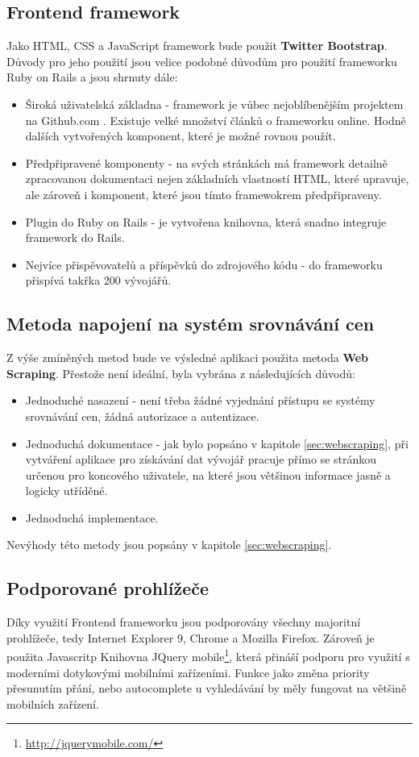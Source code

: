 \subsection{Frontend framework}
Jako HTML, CSS a JavaScript framework bude použit \textbf{Twitter Bootstrap}. Důvody pro jeho použití jsou velice podobné důvodům pro použití frameworku Ruby on Rails a jsou shrnuty dále:
\begin{itemize}
\item Široká uživatelská základna - framework je vůbec nejoblíbenějším projektem na Github.com \cite{website:github-popular}. Existuje velké množství článků o frameworku online. Hodně dalších vytvořených komponent, které je možné rovnou použít.
\item Předpřipravené komponenty - na svých stránkách má framework detailně zpracovanou dokumentaci nejen základních vlastností HTML, které upravuje, ale zároveň i komponent, které jsou tímto framewokrem předpřipraveny.
\item Plugin do Ruby on Rails - je vytvořena knihovna, která snadno integruje framework do Rails\cite{website:github-bootstrap-saas}.
\item Nejvíce přispěvovatelů a příspěvků do zdrojového kódu - do frameworku přispívá takřka 200 vývojářů.
\end{itemize}

\subsection{Metoda napojení na systém srovnávání cen}
Z výše zmíněných metod bude ve výsledné aplikaci použita metoda \textbf{Web Scraping}. Přestože není ideální, byla vybrána z následujících důvodů:
\begin{itemize}
\item Jednoduché nasazení - není třeba žádné vyjednání přístupu se systémy srovnávání cen, žádná autorizace a autentizace.
\item Jednoduchá dokumentace - jak bylo popsáno v kapitole \ref{sec:webscraping}, při vytváření aplikace pro získávání dat vývojář pracuje přímo se stránkou určenou pro koncového uživatele, na které jsou většinou informace jasně a logicky utříděné.
\item Jednoduchá implementace.
\end{itemize}
Nevýhody této metody jsou popsány v kapitole \ref{sec:webscraping}.

\subsection{Podporované prohlížeče}
Díky využití Frontend frameworku jsou podporovány všechny majoritní prohlížeče, tedy Internet Explorer 9, Chrome a Mozilla Firefox. Zároveň je použita Javascritp Knihovna JQuery mobile\footnote{\url{http://jquerymobile.com/}}, která přináší podporu pro využití s moderními dotykovými mobilními zařízeními. Funkce jako změna priority přesunutím přání, nebo autocomplete u vyhledávání by měly fungovat na většině mobilních zařízení.
